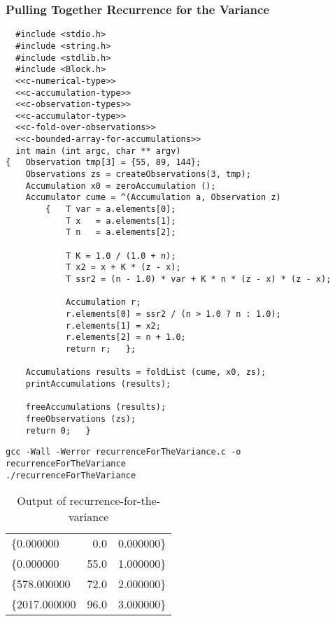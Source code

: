 \documentclass[10pt,oneside,x11names]{article}
\begin{document}
\subsubsection{Pulling Together Recurrence for the Variance}
\label{sec:orgheadline13}

\begin{verbatim}
  #include <stdio.h>
  #include <string.h>
  #include <stdlib.h>
  #include <Block.h>
  <<c-numerical-type>>
  <<c-accumulation-type>>
  <<c-observation-types>>
  <<c-accumulator-type>>
  <<c-fold-over-observations>>
  <<c-bounded-array-for-accumulations>>
  int main (int argc, char ** argv)
{   Observation tmp[3] = {55, 89, 144};
    Observations zs = createObservations(3, tmp);
    Accumulation x0 = zeroAccumulation ();
    Accumulator cume = ^(Accumulation a, Observation z)
        {   T var = a.elements[0];
            T x   = a.elements[1];
            T n   = a.elements[2];

            T K = 1.0 / (1.0 + n);
            T x2 = x + K * (z - x);
            T ssr2 = (n - 1.0) * var + K * n * (z - x) * (z - x);

            Accumulation r;
            r.elements[0] = ssr2 / (n > 1.0 ? n : 1.0);
            r.elements[1] = x2;
            r.elements[2] = n + 1.0;
            return r;   };

    Accumulations results = foldList (cume, x0, zs);
    printAccumulations (results);

    freeAccumulations (results);
    freeObservations (zs);
    return 0;   }
\end{verbatim}

\begin{verbatim}
gcc -Wall -Werror recurrenceForTheVariance.c -o recurrenceForTheVariance
./recurrenceForTheVariance
\end{verbatim}

\begin{table}[htb]
\caption{Output of recurrence-for-the-variance}
\centering
\begin{tabular}{lrl}
\{0.000000 & 0.0 & 0.000000\}\\
\{0.000000 & 55.0 & 1.000000\}\\
\{578.000000 & 72.0 & 2.000000\}\\
\{2017.000000 & 96.0 & 3.000000\}\\
\end{tabular}
\end{table}
\end{document}
